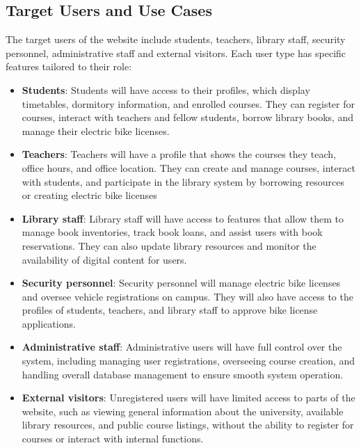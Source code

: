 \documentclass[12pt]{article}
\begin{document}
\subsection{Target Users and Use Cases} The target users of the website include students, teachers, library staff, security personnel, 
administrative staff and external visitors. Each user type has specific features tailored to their role:

\begin{itemize}
  \item \textbf{Students}: Students will have access to their profiles, which display timetables, dormitory information, and enrolled 
  courses. They can register for courses, interact with teachers and fellow students, borrow library books, and manage their electric 
  bike licenses.
  \item \textbf{Teachers}: Teachers will have a profile that shows the courses they teach, office hours, and office location. 
  They can create and manage courses, interact with students, and participate in the library system by borrowing resources or 
  creating electric bike licenses
  \item \textbf{Library staff}: Library staff will have access to features that allow them to manage book inventories, track book 
  loans, and assist users with book reservations. They can also update library resources and monitor the availability of digital 
  content for users.
  \item \textbf{Security personnel}: Security personnel will manage electric bike licenses and oversee vehicle registrations on 
  campus. They will also have access to the profiles of students, teachers, and library staff to approve bike license applications.
  \item \textbf{Administrative staff}: Administrative users will have full control over the system, including managing user 
  registrations, overseeing course creation, and handling overall database management to ensure smooth system operation.
  \item \textbf{External visitors}: Unregistered users will have limited access to parts of the website, such as viewing general 
  information about the university, available library resources, and public course listings, without the ability to register for 
  courses or interact with internal functions.  
\end{itemize}
\end{document}
